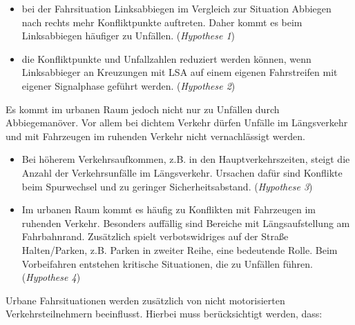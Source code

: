 \begin{itemize}
	\item bei der Fahrsituation Linksabbiegen im Vergleich zur Situation Abbiegen nach rechts mehr Konfliktpunkte auftreten. Daher kommt es beim Linksabbiegen häufiger zu Unfällen. (\textit{Hypothese 1})
	\item die Konfliktpunkte und Unfallzahlen reduziert werden können, wenn Linksabbieger an Kreuzungen mit \ac{LSA} auf einem eigenen Fahrstreifen mit eigener Signalphase geführt werden. (\textit{Hypothese 2})
\end{itemize}

Es kommt im urbanen Raum jedoch nicht nur zu Unfällen durch Abbiegemanöver. Vor allem bei dichtem Verkehr dürfen Unfälle im Längsverkehr und mit Fahrzeugen im ruhenden Verkehr nicht vernachlässigt werden. 

\begin{itemize}	
	\item Bei höherem Verkehrsaufkommen, z.B. in den Hauptverkehrszeiten, steigt die Anzahl der Verkehrsunfälle im Längsverkehr. Ursachen dafür sind Konflikte beim Spurwechsel und zu geringer Sicherheitsabstand. (\textit{Hypothese 3})
	\item Im urbanen Raum kommt es häufig zu Konflikten mit Fahrzeugen im ruhenden Verkehr. Besonders auffällig sind Bereiche mit Längsaufstellung am Fahrbahnrand. Zusätzlich spielt verbotswidriges auf der Straße Halten/Parken, z.B. Parken in zweiter Reihe, eine bedeutende Rolle. Beim Vorbeifahren entstehen kritische Situationen, die zu Unfällen führen. (\textit{Hypothese 4})
\end{itemize}

Urbane Fahrsituationen werden zusätzlich von nicht motorisierten Verkehrsteilnehmern beeinflusst. Hierbei muss berücksichtigt werden, dass:
	

